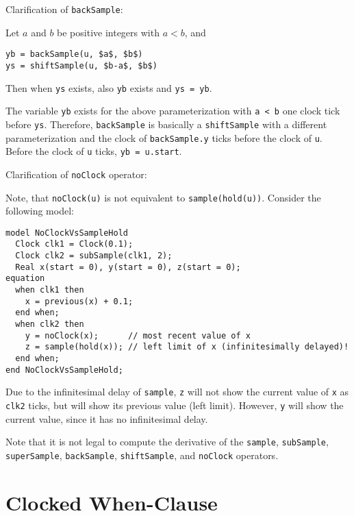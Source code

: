 \begin{nonnormative}
Clarification of \lstinline!backSample!:

Let $a$ and $b$ be positive integers with $a < b$, and
\begin{lstlisting}[language=modelica]
yb = backSample(u, $a$, $b$)
ys = shiftSample(u, $b-a$, $b$)
\end{lstlisting}

Then when \lstinline!ys! exists, also \lstinline!yb! exists and \lstinline!ys = yb!.

The variable \lstinline!yb! exists for the above parameterization with \lstinline!a < b! one clock tick before \lstinline!ys!.
Therefore, \lstinline!backSample! is basically a \lstinline!shiftSample! with a different parameterization and the clock of \lstinline!backSample.y! ticks before the clock of \lstinline!u!.
Before the clock of \lstinline!u! ticks, \lstinline!yb = u.start!.
\end{nonnormative}

\begin{nonnormative}
Clarification of \lstinline!noClock! operator:

Note, that \lstinline!noClock(u)! is not equivalent to \lstinline!sample(hold(u))!.
Consider the following model:
\begin{lstlisting}[language=modelica]
model NoClockVsSampleHold
  Clock clk1 = Clock(0.1);
  Clock clk2 = subSample(clk1, 2);
  Real x(start = 0), y(start = 0), z(start = 0);
equation
  when clk1 then
    x = previous(x) + 0.1;
  end when;
  when clk2 then
    y = noClock(x);      // most recent value of x
    z = sample(hold(x)); // left limit of x (infinitesimally delayed)!
  end when;
end NoClockVsSampleHold;
\end{lstlisting}

Due to the infinitesimal delay of \lstinline!sample!, \lstinline!z! will not show the current value of \lstinline!x! as \lstinline!clk2! ticks, but will show its previous value (left limit).
However, \lstinline!y! will show the current value, since it has no infinitesimal delay.
\end{nonnormative}

Note that it is not legal to compute the derivative of the \lstinline!sample!, \lstinline!subSample!, \lstinline!superSample!, \lstinline!backSample!,
\lstinline!shiftSample!, and \lstinline!noClock! operators.

\section{Clocked When-Clause}\label{clocked-when-clause}

